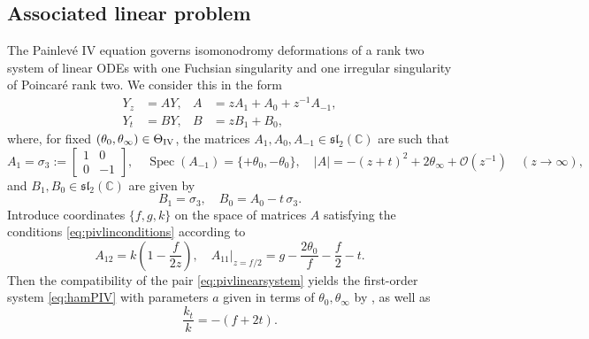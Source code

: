 \documentclass[a4paper,reqno]{amsart}
\numberwithin{equation}{section}
\newcommand{\pain}[1]{\operatorname{P}_{\mathrm{#1}}}
\numberwithin{equation}{section}
\begin{document}
\subsection{Associated linear problem}

The Painlev\'e IV equation governs isomonodromy deformations of a rank two system of linear ODEs with one Fuchsian singularity and one irregular singularity of Poincar\'e rank two.
We consider this in the form
\begin{subequations}\label{eq:pivlinearsystem}
    \begin{align}
    Y_z&=AY, & A&=zA_1+A_0+z^{-1}A_{-1},\label{eq:pivlinearsystem1}\\
    Y_t&=BY, & B&=zB_1+B_0,
\end{align}
\end{subequations}
where, for fixed $(\theta_0,\theta_{\infty})\in \Theta_{\rm{IV}}$, the matrices $A_1,A_0,A_{-1}\in \mathfrak{sl}_2(\mathbb{C})$ are such that
		\begin{equation}\label{eq:pivlinconditions}
A_1=\sigma_3:=\begin{bmatrix}
        1 & 0\\
        0 & -1
    \end{bmatrix},\quad \operatorname{Spec}(A_{-1})=\{+\theta_0,-\theta_0\},\quad |A|=-(z+t)^2+2\theta_\infty+\mathcal{O}(z^{-1}) \quad (z\rightarrow \infty),
	\end{equation}
 and $B_1,B_0\in \mathfrak{sl}_2(\mathbb{C})$ are given by
\begin{equation*}
    B_1=\sigma_3,\quad B_0=A_0-t\,\sigma_3.
\end{equation*}
Introduce coordinates $\{f,g,k\}$ on the space of matrices $A$ satisfying the conditions \eqref{eq:pivlinconditions} according to 
\begin{equation*}
 A_{12}=k\left(1-\frac{f}{2z}\right),\quad A_{11}|_{z=f/2}=g-\frac{2 \theta _0}{f}-\frac{f}{2}-t.  
\end{equation*}
Then the compatibility of the pair \eqref{eq:pivlinearsystem} yields
the first-order system \eqref{eq:hamPIV} with parameters $a$ given in terms of $\theta_0,\theta_{\infty}$ by , as well as 
\begin{equation*}
   \frac{k_t}{k}=-(f+2t). 
\end{equation*}
\end{document}
